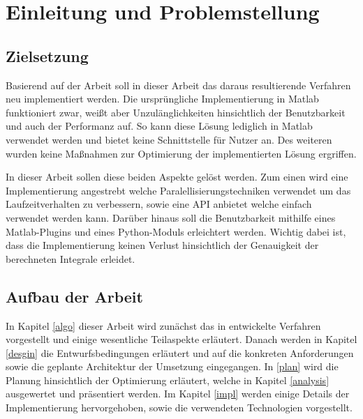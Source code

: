 \chapter{Einleitung und Problemstellung}


\section{Zielsetzung}

Basierend auf der Arbeit \cite{gasperini:hal-03209144} soll in dieser Arbeit das daraus resultierende Verfahren neu implementiert werden.
Die ursprüngliche Implementierung in Matlab funktioniert zwar, weißt aber Unzulänglichkeiten hinsichtlich der Benutzbarkeit und auch der Performanz auf.
So kann diese Lösung lediglich in Matlab verwendet werden und bietet keine Schnittstelle für Nutzer an. Des weiteren wurden keine Maßnahmen zur Optimierung der implementierten Lösung ergriffen.

In dieser Arbeit sollen diese beiden Aspekte gelöst werden. Zum einen wird eine Implementierung angestrebt welche Paralellisierungstechniken verwendet um das Laufzeitverhalten zu verbessern, sowie eine API anbietet welche einfach verwendet werden kann.
Darüber hinaus soll die Benutzbarkeit mithilfe eines Matlab-Plugins und eines Python-Moduls erleichtert werden.
Wichtig dabei ist, dass die Implementierung keinen Verlust hinsichtlich der Genauigkeit der berechneten Integrale erleidet.



\section{Aufbau der Arbeit}

In Kapitel \ref{algo} dieser Arbeit wird zunächst das in \cite{gasperini:hal-03209144} entwickelte Verfahren vorgestellt und einige wesentliche Teilaspekte erläutert.
Danach werden in Kapitel \ref{desgin} die Entwurfsbedingungen erläutert und auf die konkreten Anforderungen sowie die geplante Architektur der Umsetzung eingegangen.
In \ref{plan} wird die Planung hinsichtlich der Optimierung erläutert, welche in Kapitel \ref{analysis} ausgewertet und präsentiert werden.
Im Kapitel \ref{impl} werden einige Details der Implementierung hervorgehoben, sowie die verwendeten Technologien vorgestellt.